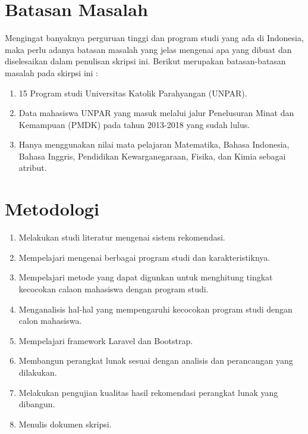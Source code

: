 \section{Batasan Masalah}
\label{sec:batasan}
Mengingat banyaknya perguruan tinggi dan program studi yang ada di Indonesia, maka perlu adanya batasan masalah yang jelas mengenai apa yang dibuat dan diselesaikan dalam penulisan skripsi ini. Berikut merupakan batasan-batasan masalah pada skirpsi ini : \\
	\begin{enumerate}
		\item 15 Program studi Universitas Katolik Parahyangan (UNPAR).
		\item Data mahasiswa UNPAR yang masuk melalui jalur Penelusuran Minat dan Kemampuan (PMDK) pada tahun 2013-2018 yang sudah lulus.
		\item Hanya menggunakan nilai mata pelajaran Matematika, Bahasa Indonesia, Bahasa Inggris, Pendidikan Kewarganegaraan, Fisika, dan Kimia sebagai atribut.
	\end{enumerate}
	

\section{Metodologi}
\label{sec:metlit}
\begin{enumerate}
	\item Melakukan studi literatur mengenai sistem rekomendasi.
	\item Mempelajari mengenai berbagai program studi dan karakteristiknya.
	\item Mempelajari metode yang dapat digunkan untuk menghitung tingkat kecocokan calaon mahasiswa dengan program studi.
	\item Menganalisis hal-hal yang mempengaruhi kecocokan program studi dengan calon mahasiswa.
	\item Mempelajari framework Laravel dan Bootstrap.
	\item Membangun perangkat lunak sesuai dengan analisis dan perancangan yang dilakukan.
	\item Melakukan pengujian kualitas hasil rekomendasi perangkat lunak yang dibangun.
	\item Menulis dokumen skripsi.
\end{enumerate}

